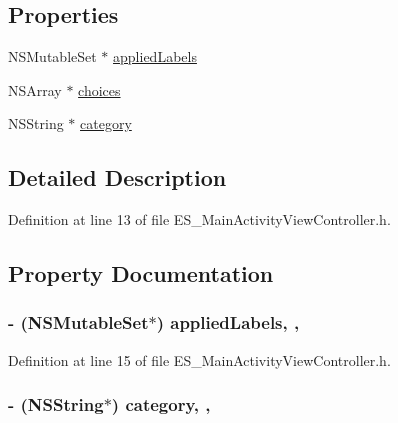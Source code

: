 \subsection*{Properties}
\begin{DoxyCompactItemize}
\item 
N\+S\+Mutable\+Set $\ast$ \hyperlink{interface_e_s___main_activity_view_controller_a5e80220257414ea021e1855831be183c}{applied\+Labels}
\item 
N\+S\+Array $\ast$ \hyperlink{interface_e_s___main_activity_view_controller_ae463b4929b18a7a51b4a6ecadf8e1e63}{choices}
\item 
N\+S\+String $\ast$ \hyperlink{interface_e_s___main_activity_view_controller_a98ed42ef8813b8073a8735d58d904ee7}{category}
\end{DoxyCompactItemize}


\subsection{Detailed Description}


Definition at line 13 of file E\+S\+\_\+\+Main\+Activity\+View\+Controller.\+h.



\subsection{Property Documentation}
\hypertarget{interface_e_s___main_activity_view_controller_a5e80220257414ea021e1855831be183c}{
\subsubsection[{applied\+Labels}]{\setlength{\rightskip}{0pt plus 5cm}-\/ (N\+S\+Mutable\+Set$\ast$) applied\+Labels\hspace{0.3cm}{\ttfamily [read]}, {\ttfamily [write]}, {\ttfamily [atomic]}}}\label{interface_e_s___main_activity_view_controller_a5e80220257414ea021e1855831be183c}


Definition at line 15 of file E\+S\+\_\+\+Main\+Activity\+View\+Controller.\+h.

\hypertarget{interface_e_s___main_activity_view_controller_a98ed42ef8813b8073a8735d58d904ee7}{
\subsubsection[{category}]{\setlength{\rightskip}{0pt plus 5cm}-\/ (N\+S\+String$\ast$) category\hspace{0.3cm}{\ttfamily [read]}, {\ttfamily [write]}, {\ttfamily [atomic]}}}\label{interface_e_s___main_activity_view_controller_a98ed42ef8813b8073a8735d58d904ee7}


